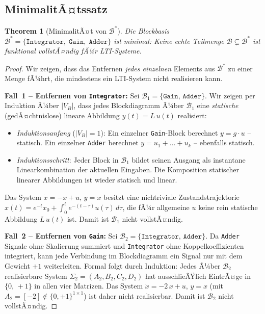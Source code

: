 ﻿\documentclass[12pt,a4paper]{article}
\newtheorem{theorem}{Theorem}[section]
\theoremstyle{definition}
\begin{document}
\subsection{MinimalitÃ¤tssatz}

\begin{theorem}[MinimalitÃ¤t von $\mathcal{B}^*$]
\label{thm:minimal}
Die Blockbasis $\mathcal{B}^* = \{\texttt{Integrator},\;\texttt{Gain},\;\texttt{Adder}\}$
ist minimal: Keine echte Teilmenge $\mathcal{B} \subsetneq \mathcal{B}^*$
ist funktional vollstÃ¤ndig fÃ¼r LTI-Systeme.
\end{theorem}

\begin{proof}
Wir zeigen, dass das Entfernen \emph{jedes einzelnen} Elements aus
$\mathcal{B}^*$ zu einer Menge fÃ¼hrt, die mindestens ein LTI-System
nicht realisieren kann.

\medskip
\textbf{Fall~1 -- Entfernen von \texttt{Integrator}:}
Sei $\mathcal{B}_1 = \{\texttt{Gain},\,\texttt{Adder}\}$. Wir zeigen
per Induktion Ã¼ber $|V_B|$, dass jedes Blockdiagramm Ã¼ber $\mathcal{B}_1$
eine \emph{statische} (gedÃ¤chtnislose) lineare Abbildung
$y(t) = L\,u(t)$ realisiert:
\begin{itemize}[nosep]
  \item \emph{Induktionsanfang} ($|V_B|=1$): Ein einzelner \texttt{Gain}-Block
        berechnet $y = g\cdot u$ -- statisch. Ein einzelner \texttt{Adder}
        berechnet $y = u_1 + \ldots + u_k$ -- ebenfalls statisch.
  \item \emph{Induktionsschritt}: Jeder Block in $\mathcal{B}_1$ bildet
        seinen Ausgang als instantane Linearkombination der aktuellen
        Eingaben. Die Komposition statischer linearer Abbildungen ist wieder
        statisch und linear.
\end{itemize}
Das System $\dot{x} = -x + u$,\; $y = x$ besitzt eine nichtriviale
Zustandstrajektorie
$x(t) = e^{-t}x_0 + \int_0^t e^{-(t-\tau)}u(\tau)\,d\tau$,
die fÃ¼r allgemeine $u$ keine rein statische Abbildung $L\,u(t)$ ist.
Damit ist $\mathcal{B}_1$ nicht vollstÃ¤ndig.

\medskip
\textbf{Fall~2 -- Entfernen von \texttt{Gain}:}
Sei $\mathcal{B}_2 = \{\texttt{Integrator},\,\texttt{Adder}\}$. Da
\texttt{Adder} Signale ohne Skalierung summiert und \texttt{Integrator}
ohne Koppelkoeffizienten integriert, kann jede Verbindung im Blockdiagramm
ein Signal nur mit dem Gewicht $+1$ weiterleiten. Formal folgt durch
Induktion: Jedes Ã¼ber $\mathcal{B}_2$ realisierbare System
$\Sigma_2 = (A_2, B_2, C_2, D_2)$ hat ausschlieÃŸlich EintrÃ¤ge in
$\{0,\,+1\}$ in allen vier Matrizen. Das System
$\dot{x} = -2\,x + u$,\; $y = x$ (mit $A_2 = [-2] \notin \{0,+1\}^{1\times
1}$) ist daher nicht realisierbar. Damit ist $\mathcal{B}_2$ nicht vollstÃ¤ndig.


\end{proof}
\end{document}
